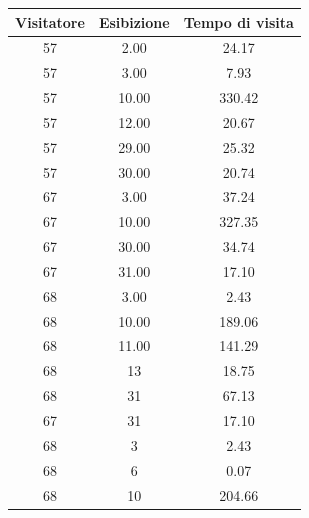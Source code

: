 \documentclass[12pt]{article}
\begin{document}
\begin{table}[!ht]
    \centering
    \begin{tabular}{|c|c|c|}
        \hline
        \textbf{Visitatore} & \textbf{Esibizione} & \textbf{Tempo di visita} \\ \hline
        57                  & 2.00                & 24.17                    \\ \hline
        57                  & 3.00                & 7.93                     \\ \hline
        57                  & 10.00               & 330.42                   \\ \hline
        57                  & 12.00               & 20.67                    \\ \hline
        57                  & 29.00               & 25.32                    \\ \hline
        57                  & 30.00               & 20.74                    \\ \hline
        67                  & 3.00                & 37.24                    \\ \hline
        67                  & 10.00               & 327.35                   \\ \hline
        67                  & 30.00               & 34.74                    \\ \hline
        67                  & 31.00               & 17.10                    \\ \hline
        68                  & 3.00                & 2.43                     \\ \hline
        68                  & 10.00               & 189.06                   \\ \hline
        68                  & 11.00               & 141.29                   \\ \hline
        68                  & 13                  & 18.75                    \\ \hline
        68                  & 31                  & 67.13                    \\ \hline
        67                  & 31                  & 17.10                    \\ \hline
        68                  & 3                   & 2.43                     \\ \hline
        68                  & 6                   & 0.07                     \\ \hline
        68                  & 10                  & 204.66                   \\ \hline

\end{tabular}
\end{table}
\end{document}
